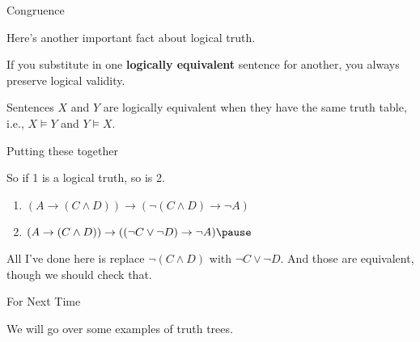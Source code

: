 \documentclass[
  ignorenonframetext,
]{beamer}
\providecommand{\tightlist}{%
  \setlength{\itemsep}{0pt}\setlength{\parskip}{0pt}}
\renewcommand{\,}{\text{, }}
\renewenvironment*{quote}	
	{\list{}{\rightmargin   \leftmargin} \item } 	
	{\endlist }
\begin{document}
\begin{frame}{Congruence}
\protect\hypertarget{congruence}{}

Here's another important fact about logical truth.

\begin{quote}
If you substitute in one \textbf{logically equivalent} sentence for
another, you always preserve logical validity.
\end{quote}

Sentences \(X\) and \(Y\) are logically equivalent when they have the
same truth table, i.e., \(X \vDash Y\) and \(Y \vDash X\).

\end{frame}

\begin{frame}{Putting these together}
\protect\hypertarget{putting-these-together}{}

So if 1 is a logical truth, so is 2.

\begin{enumerate}
\tightlist
\item
  \((A \rightarrow (C \wedge D)) \rightarrow (\neg (C \wedge D) \rightarrow \neg A)\)
\item
  \((A \rightarrow (C \wedge D)) \rightarrow ((\neg C \vee \neg D) \rightarrow \neg A) \pause\)
\end{enumerate}

All I've done here is replace \(\neg (C \wedge D)\) with
\(\neg C \vee \neg D\). And those are equivalent, though we should check
that.

\end{frame}

\begin{frame}{For Next Time}
\protect\hypertarget{for-next-time}{}

We will go over some examples of truth trees.

\end{frame}
\end{document}
